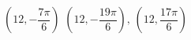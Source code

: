 { $\left( 12, -\dfrac{7\pi}{6} \right)$}
{$\left( 12, -\dfrac{19\pi}{6} \right), \, \left( 12, \dfrac{17\pi}{6} \right)$\\ }
